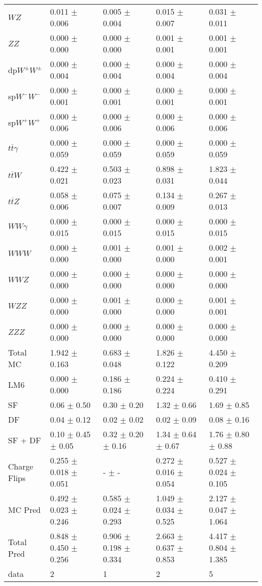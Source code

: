 \begin{tabular}{l | l l l l}
$WZ$ &  0.011 $\pm$  0.006 &  0.005 $\pm$  0.004 &  0.015 $\pm$  0.007 &  0.031 $\pm$  0.011\\
$ZZ$ &   0.000 $\pm$   0.000 &   0.000 $\pm$   0.000 &  0.001 $\pm$  0.001 &  0.001 $\pm$  0.001\\
\hline
dp$W^{\pm}W^{\pm}$ &  0.000 $\pm$  0.004 &  0.000 $\pm$  0.004 &  0.000 $\pm$  0.004 &  0.000 $\pm$  0.004\\
sp$W^{-}W^{-}$ &  0.000 $\pm$  0.001 &  0.000 $\pm$  0.001 &  0.000 $\pm$  0.001 &  0.000 $\pm$  0.001\\
sp$W^{+}W^{+}$ &  0.000 $\pm$  0.006 &  0.000 $\pm$  0.006 &  0.000 $\pm$  0.006 &  0.000 $\pm$  0.006\\
$t\overline{t}\gamma$ &  0.000 $\pm$  0.059 &  0.000 $\pm$  0.059 &  0.000 $\pm$  0.059 &  0.000 $\pm$  0.059\\
$t\overline{t}W$ &  0.422 $\pm$  0.021 &  0.503 $\pm$  0.023 &  0.898 $\pm$  0.031 &  1.823 $\pm$  0.044\\
$t\overline{t}Z$ &  0.058 $\pm$  0.006 &  0.075 $\pm$  0.007 &  0.134 $\pm$  0.009 &  0.267 $\pm$  0.013\\
$WW\gamma$ &  0.000 $\pm$  0.015 &  0.000 $\pm$  0.015 &  0.000 $\pm$  0.015 &  0.000 $\pm$  0.015\\
$WWW$ &   0.000 $\pm$   0.000 &  0.001 $\pm$   0.000 &  0.001 $\pm$   0.000 &  0.002 $\pm$  0.001\\
$WWZ$ &   0.000 $\pm$   0.000 &   0.000 $\pm$   0.000 &  0.000 $\pm$   0.000 &   0.000 $\pm$   0.000\\
$WZZ$ &   0.000 $\pm$   0.000 &  0.001 $\pm$   0.000 &   0.000 $\pm$   0.000 &  0.001 $\pm$  0.001\\
$ZZZ$ &   0.000 $\pm$   0.000 &   0.000 $\pm$   0.000 &   0.000 $\pm$   0.000 &   0.000 $\pm$   0.000\\
\hline
Total MC &  1.942 $\pm$  0.163 &  0.683 $\pm$  0.048 &  1.826 $\pm$  0.122 &  4.450 $\pm$  0.209\\
\hline\hline
\hline
LM6 &  0.000 $\pm$  0.000 &  0.186 $\pm$  0.186 &  0.224 $\pm$  0.224 &  0.410 $\pm$  0.291\\
\hline\hline
\hline\hline
 SF  & 0.06 $\pm$ 0.50 & 0.30 $\pm$ 0.20 & 1.32 $\pm$ 0.66 & 1.69 $\pm$ 0.85\\
 DF  & 0.04 $\pm$ 0.12 & 0.02 $\pm$ 0.02 & 0.02 $\pm$ 0.09 & 0.08 $\pm$ 0.16\\
\hline
 SF + DF  & 0.10 $\pm$ 0.45 $\pm$ 0.05 & 0.32 $\pm$ 0.20 $\pm$ 0.16 & 1.34 $\pm$ 0.64 $\pm$ 0.67 & 1.76 $\pm$ 0.80 $\pm$ 0.88\\
\hline\hline
Charge Flips & 0.255 $\pm$ 0.018 $\pm$ 0.051 & - $\pm$ - & 0.272 $\pm$ 0.016 $\pm$ 0.054 & 0.527 $\pm$ 0.024 $\pm$ 0.105\\
\hline\hline
\hline
MC Pred &  0.492 $\pm$  0.023 $\pm$  0.246 &  0.585 $\pm$  0.024 $\pm$  0.293 &  1.049 $\pm$  0.034 $\pm$  0.525 &  2.127 $\pm$  0.047 $\pm$  1.064\\
\hline\hline
Total Pred &  0.848 $\pm$  0.450 $\pm$  0.256 &  0.906 $\pm$  0.198 $\pm$  0.334 &  2.663 $\pm$  0.637 $\pm$  0.853 &  4.417 $\pm$  0.804 $\pm$  1.385\\
\hline\hline
data & 2 & 1 & 2 & 5\\
\hline\hline
\end{tabular}
